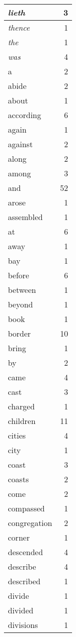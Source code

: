 \begin{center}
\begin{longtable}{l|r}
\emph{lieth} & 3\\ \hline 
\emph{thence} & 1\\ \hline 
\emph{the} & 1\\ \hline 
\emph{was} & 4\\ \hline 
a & 2\\ \hline 
abide & 2\\ \hline 
about & 1\\ \hline 
according & 6\\ \hline 
again & 1\\ \hline 
against & 2\\ \hline 
along & 2\\ \hline 
among & 3\\ \hline 
and & 52\\ \hline 
arose & 1\\ \hline 
assembled & 1\\ \hline 
at & 6\\ \hline 
away & 1\\ \hline 
bay & 1\\ \hline 
before & 6\\ \hline 
between & 1\\ \hline 
beyond & 1\\ \hline 
book & 1\\ \hline 
border & 10\\ \hline 
bring & 1\\ \hline 
by & 2\\ \hline 
came & 4\\ \hline 
cast & 3\\ \hline 
charged & 1\\ \hline 
children & 11\\ \hline 
cities & 4\\ \hline 
city & 1\\ \hline 
coast & 3\\ \hline 
coasts & 2\\ \hline 
come & 2\\ \hline 
compassed & 1\\ \hline 
congregation & 2\\ \hline 
corner & 1\\ \hline 
descended & 4\\ \hline 
describe & 4\\ \hline 
described & 1\\ \hline 
divide & 1\\ \hline 
divided & 1\\ \hline 
divisions & 1\\ \hline 

\end{longtable}
\end{center}
